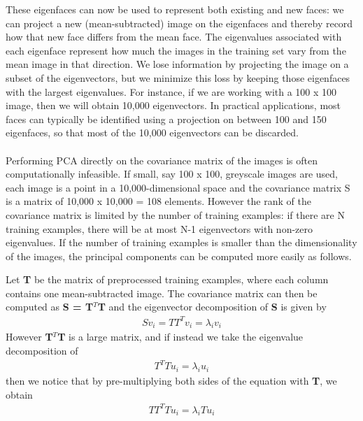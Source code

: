 \documentclass[12pt]{article}			%
\begin{document}
These eigenfaces can now be used to represent both existing and new faces: we can project a new (mean-subtracted) image on the eigenfaces and thereby record how that new face differs from the mean face. The eigenvalues associated with each eigenface represent how much the images in the training set vary from the mean image in that direction. We lose information by projecting the image on a subset of the eigenvectors, but we minimize this loss by keeping those eigenfaces with the largest eigenvalues. For instance, if we are working with a 100 x 100 image, then we will obtain 10,000 eigenvectors. In practical applications, most faces can typically be identified using a projection on between 100 and 150 eigenfaces, so that most of the 10,000 eigenvectors can be discarded.\\[2ex]
\\
Performing PCA directly on the covariance matrix of the images is often computationally infeasible. If small, say 100 x 100, greyscale images are used, each image is a point in a 10,000-dimensional space and the covariance matrix S is a matrix of 10,000 x 10,000 = 108 elements. However the rank of the covariance matrix is limited by the number of training examples: if there are N training examples, there will be at most N-1 eigenvectors with non-zero eigenvalues. If the number of training examples is smaller than the dimensionality of the images, the principal components can be computed more easily as follows.

Let {\bf T} be the matrix of preprocessed training examples, where each column contains one mean-subtracted image. The covariance matrix can then be computed as {\bf S = T$^{T}$T} and the eigenvector decomposition of {\bf S} is given by\\
\begin{align*}
Sv_{i} = TT^{T}v_{i} = \lambda_{i}v_{i}
\end{align*}
However {\bf T$^{T}$T } is a large matrix, and if instead we take the eigenvalue decomposition of
\begin{align*}
T^{T}Tu_{i} = \lambda_{i}u_{i}
\end{align*}
then we notice that by pre-multiplying both sides of the equation with {\bf T}, we obtain
\begin{align*}
TT^{T}Tu_{i} = \lambda_{i}Tu_{i}
\end{align*}
\end{document}
